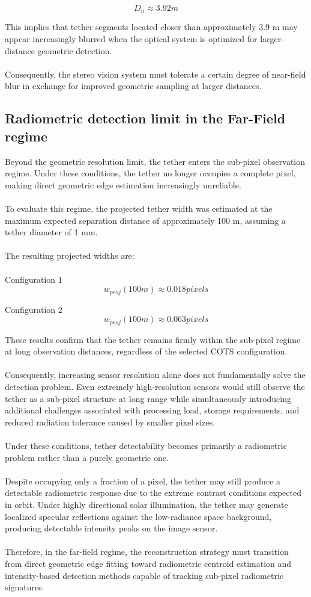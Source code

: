 \[
D_n \approx 3.92 m
\]

This implies that tether segments located closer than approximately 3.9 m may appear increasingly blurred when the optical system is optimized for larger-distance geometric detection.
\\\\
Consequently, the stereo vision system must tolerate a certain degree of near-field blur in exchange for improved geometric sampling at larger distances.

\subsection{Radiometric detection limit in the Far-Field regime}

Beyond the geometric resolution limit, the tether enters the sub-pixel observation regime. Under these conditions, the tether no longer occupies a complete pixel, making direct geometric edge estimation increasingly unreliable.
\\\\
To evaluate this regime, the projected tether width was estimated at the maximum expected separation distance of approximately 100 m, assuming a tether diameter of 1 mm.
\\\\
The resulting projected widths are:
\\\\
Configuration 1
\[
w_{proj}(100m) \approx 0.018 pixels
\]

Configuration 2
\[
w_{proj}(100m) \approx 0.063 pixels
\]

These results confirm that the tether remains firmly within the sub-pixel regime at long observation distances, regardless of the selected COTS configuration.
\\\\
Consequently, increasing sensor resolution alone does not fundamentally solve the detection problem. Even extremely high-resolution sensors would still observe the tether as a sub-pixel structure at long range while simultaneously introducing additional challenges associated with processing load, storage requirements, and reduced radiation tolerance caused by smaller pixel sizes.
\\\\
Under these conditions, tether detectability becomes primarily a radiometric problem rather than a purely geometric one.
\\\\
Despite occupying only a fraction of a pixel, the tether may still produce a detectable radiometric response due to the extreme contrast conditions expected in orbit. Under highly directional solar illumination, the tether may generate localized specular reflections against the low-radiance space background, producing detectable intensity peaks on the image sensor.
\\\\
Therefore, in the far-field regime, the reconstruction strategy must transition from direct geometric edge fitting toward radiometric centroid estimation and intensity-based detection methods capable of tracking sub-pixel radiometric signatures.

